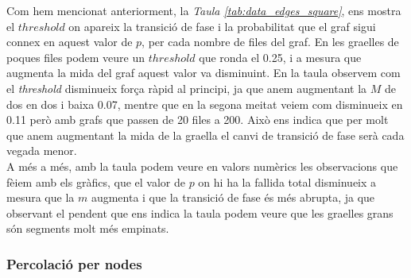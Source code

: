 \documentclass[a4paper]{article}
\begin{document}
	Com hem mencionat anteriorment, la \textit{Taula \ref{tab:data_edges_square}}, ens mostra el $threshold$ on apareix la transició de fase i la probabilitat que el graf sigui connex en aquest valor de $p$, per cada nombre de files del graf. En les graelles de poques files podem veure un $threshold$ que ronda el 0.25, i a mesura que augmenta la mida del graf aquest valor va disminuint. En la taula observem com el \textit{threshold} disminueix força ràpid al principi, ja que anem augmentant la $M$ de dos en dos i baixa 0.07, mentre que en la segona meitat veiem com disminueix en 0.11 però amb grafs que passen de 20 files a 200. Això ens indica que per molt que anem augmentant la mida de la graella el canvi de transició de fase serà cada vegada menor. \\
	
	A més a més, amb la taula podem veure en valors numèrics les observacions que fèiem amb els gràfics, que el valor de $p$ on hi ha la fallida total disminueix a mesura que la $m$ augmenta i que la transició de fase és més abrupta, ja que observant el pendent que ens indica la taula podem veure que les graelles grans són segments molt més empinats.
	
	\subsubsection{Percolació per nodes}
	
\end{document}
